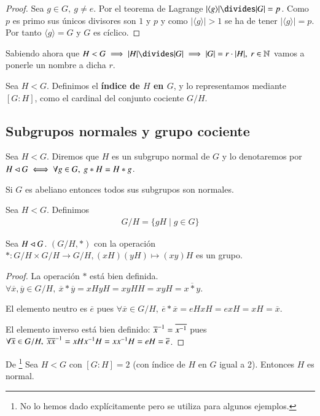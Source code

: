 \begin{proof}
	Sea $g \in G,\ g \neq e$. Por el teorema de Lagrange $|\langle g \rangle| \divides |G| = p$. Como $p$ es primo sus únicos divisores son $1$ y $p$ y como $|\langle g \rangle| > 1$ se ha de tener $|\langle g \rangle| = p$. Por tanto $\langle g \rangle = G$ y $G$ es cíclico. 
\end{proof}

Sabiendo ahora que $H < G \implies |H| \divides |G| \implies |G| = r \cdot |H|,\ r \in \N$ vamos a ponerle un nombre a dicha $r$.


\begin{dfn}
	Sea $H < G$. Definimos el \textbf{índice de $H$ en $G$}, y lo representamos mediante $[G:H]$, como el cardinal del conjunto cociente $G/H$. \cite{dor96}
\end{dfn}

\subsection{Subgrupos normales y grupo cociente}

\begin{dfn}
	Sea $H < G$. Diremos que $H$ es un subgrupo normal de $G$ y lo denotaremos por $H \lhd G \iff \forall g \in G,\ g\ast H = H \ast g$.  
\end{dfn}

\begin{pro}
	Si $G$ es abeliano entonces todos sus subgrupos son normales.
\end{pro}


\begin{dfn}
	Sea $H < G$. Definimos
	\begin{align}
	G/H = \{gH \mid g \in G\}
	\end{align}
\end{dfn}

\begin{pro}
	Sea $H \lhd G$. $(G/H, \ast)$ con la operación $\ast: G/H \times G/H \to G/H, (xH)(yH) \mapsto (xy)H$ es un grupo.
\end{pro}

\begin{proof}
	La operación $\ast$ está bien definida. $\forall \overline{x}, \overline{y} \in G/H,\ \overline{x} \ast \overline{y} = xHyH = xyHH = xyH = \overline{x \ast y}$.
	
	El elemento neutro es $\overline{e}$ pues $\forall \overline{x} \in G/H,\ \overline{e} \ast \overline{x} = eHxH = exH = xH = \overline{x}$.
	
	El elemento inverso está bien definido: $\overline{x}^{-1} = \overline{x^{-1}}$ pues $\forall \overline{x} \in G/H,\ \overline{x}\inv{\overline{x}} = xH \inv{x}H = x\inv{x}H = eH = \overline{e}$.
\end{proof}

\begin{thm}
	\label{thm:indice2normal}
	De \cite{dor96}\footnote{No lo hemos dado explícitamente pero se utiliza para algunos ejemplos.}
	Sea $H < G$ con $[G : H] = 2$ (con índice de $H$ en $G$ igual a 2). Entonces $H$ es normal.
\end{thm}